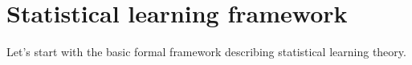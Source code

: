 \section{Statistical learning framework}
\setcounter{figure}{0}

Let's start with the basic formal framework describing statistical learning theory. 



